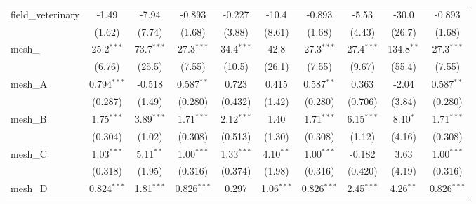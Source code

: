 \begin{tabular}{lccccccccc}
   field\_veterinary                                           & -1.49          & -7.94          & -0.893         & -0.227         & -10.4          & -0.893         & -5.53          & -30.0          & -0.893\\   
                                                               & (1.62)         & (7.74)         & (1.68)         & (3.88)         & (8.61)         & (1.68)         & (4.43)         & (26.7)         & (1.68)\\   
   mesh\_                                                      & 25.2$^{***}$   & 73.7$^{***}$   & 27.3$^{***}$   & 34.4$^{***}$   & 42.8           & 27.3$^{***}$   & 27.4$^{***}$   & 134.8$^{**}$   & 27.3$^{***}$\\   
                                                               & (6.76)         & (25.5)         & (7.55)         & (10.5)         & (26.1)         & (7.55)         & (9.67)         & (55.4)         & (7.55)\\   
   mesh\_A                                                     & 0.794$^{***}$  & -0.518         & 0.587$^{**}$   & 0.723          & 0.415          & 0.587$^{**}$   & 0.363          & -2.04          & 0.587$^{**}$\\   
                                                               & (0.287)        & (1.49)         & (0.280)        & (0.432)        & (1.42)         & (0.280)        & (0.706)        & (3.84)         & (0.280)\\   
   mesh\_B                                                     & 1.75$^{***}$   & 3.89$^{***}$   & 1.71$^{***}$   & 2.12$^{***}$   & 1.40           & 1.71$^{***}$   & 6.15$^{***}$   & 8.10$^{*}$     & 1.71$^{***}$\\   
                                                               & (0.304)        & (1.02)         & (0.308)        & (0.513)        & (1.30)         & (0.308)        & (1.12)         & (4.16)         & (0.308)\\   
   mesh\_C                                                     & 1.03$^{***}$   & 5.11$^{**}$    & 1.00$^{***}$   & 1.33$^{***}$   & 4.10$^{**}$    & 1.00$^{***}$   & -0.182         & 3.63           & 1.00$^{***}$\\   
                                                               & (0.318)        & (1.95)         & (0.316)        & (0.374)        & (1.98)         & (0.316)        & (0.420)        & (4.19)         & (0.316)\\   
   mesh\_D                                                     & 0.824$^{***}$  & 1.81$^{***}$   & 0.826$^{***}$  & 0.297          & 1.06$^{***}$   & 0.826$^{***}$  & 2.45$^{***}$   & 4.26$^{**}$    & 0.826$^{***}$\\   

\end{tabular}

